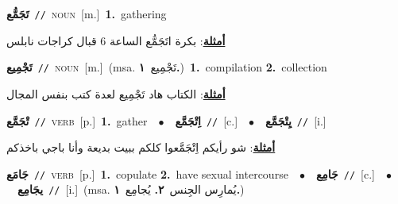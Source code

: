 \documentclass[10pt,a4paper,twoside]{article} %
\begin{document}
\begin{multicols}{2}
{\setlength\topsep{0pt}\textbf{\foreignlanguage{arabic}{تَجَمُّع}}\ {\color{gray}\texttt{//}\color{black}}\ \textsc{noun}\ [m.]\ \textbf{1.}~gathering\  \begin{flushright}\color{gray}\foreignlanguage{arabic}{\textbf{\underline{\foreignlanguage{arabic}{أمثلة}}}: بكرة اتَجَمُّع الساعة 6 قبال كراجات نابلس}\end{flushright}\color{black}} \vspace{2mm}

{\setlength\topsep{0pt}\textbf{\foreignlanguage{arabic}{تَجْمِيع}}\ {\color{gray}\texttt{//}\color{black}}\ \textsc{noun}\ [m.]\ \color{gray}(msa. \foreignlanguage{arabic}{تَجْمِيع}~\foreignlanguage{arabic}{\textbf{١.}})\color{black}\ \textbf{1.}~compilation  \textbf{2.}~collection\  \begin{flushright}\color{gray}\foreignlanguage{arabic}{\textbf{\underline{\foreignlanguage{arabic}{أمثلة}}}: الكتاب هاد تَجْمِيع لعدة كتب بنفس المجال}\end{flushright}\color{black}} \vspace{2mm}

{\setlength\topsep{0pt}\textbf{\foreignlanguage{arabic}{تْجَمَّع}}\ {\color{gray}\texttt{//}\color{black}}\ \textsc{verb}\ [p.]\ \textbf{1.}~gather\ \ $\bullet$\ \ \setlength\topsep{0pt}\textbf{\foreignlanguage{arabic}{اِتْجَمَّع}}\ {\color{gray}\texttt{//}\color{black}}\ [c.]\ \ $\bullet$\ \ \setlength\topsep{0pt}\textbf{\foreignlanguage{arabic}{يِتْجَمَّع}}\ {\color{gray}\texttt{//}\color{black}}\ [i.]\  \begin{flushright}\color{gray}\foreignlanguage{arabic}{\textbf{\underline{\foreignlanguage{arabic}{أمثلة}}}: شو رأيكم اِتْجَمَّعوا كلكم ببيت بديعة وأنا باجي باخذكم}\end{flushright}\color{black}} \vspace{2mm}

{\setlength\topsep{0pt}\textbf{\foreignlanguage{arabic}{جَامَع}}\ {\color{gray}\texttt{//}\color{black}}\ \textsc{verb}\ [p.]\ \textbf{1.}~copulate  \textbf{2.}~have sexual intercourse\ \ $\bullet$\ \ \setlength\topsep{0pt}\textbf{\foreignlanguage{arabic}{جَامِع}}\ {\color{gray}\texttt{//}\color{black}}\ [c.]\ \ $\bullet$\ \ \setlength\topsep{0pt}\textbf{\foreignlanguage{arabic}{يجَامِع}}\ {\color{gray}\texttt{//}\color{black}}\ [i.]\ \color{gray}(msa. \foreignlanguage{arabic}{يُمارِس الجِنس}~\foreignlanguage{arabic}{\textbf{٢.}}  \foreignlanguage{arabic}{يُجامِع}~\foreignlanguage{arabic}{\textbf{١.}})\color{black}\ } \vspace{2mm}


\end{multicols}
\end{document}
